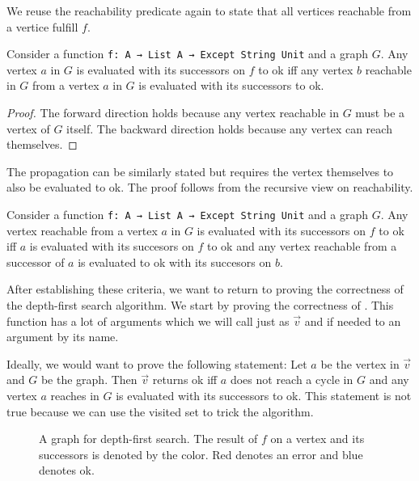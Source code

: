 We reuse the reachability predicate again to state that all vertices reachable from a vertice fulfill $f$.

\begin{lemma}[\allTrueIfAllCanReachTrue]\label{lem:allTrueIfAllCanReachTrue}
  Consider a function \lstinline|f: A → List A → Except String Unit| and a graph $G$. Any vertex $a$ in $G$ is evaluated with its successors on $f$ to ok iff any vertex $b$ reachable in $G$ from a vertex $a$ in $G$ is evaluated with its successors to ok.
\end{lemma}
\begin{proof}
  The forward direction holds because any vertex reachable in $G$ must be a vertex of $G$ itself. The backward direction holds because any vertex can reach themselves.
\end{proof}

The propagation can be similarly stated but requires the vertex themselves to also be evaluated to ok. The proof follows from the recursive view on reachability.

\begin{lemma}[\canReachLemma]
  Consider a function \lstinline|f: A → List A → Except String Unit| and a graph $G$.
  Any vertex reachable from a vertex $a$ in $G$ is evaluated with its successors on $f$ to ok iff $a$ is evaluated with its succesors on $f$ to ok and any vertex reachable from a successor of $a$ is evaluated to ok with its succesors on $b$.
\end{lemma}

After establishing these criteria, we want to return to proving the correctness of the depth-first search algorithm. We start by proving the correctness of \dfsstep. This function has a lot of arguments which we will call just as $\vec{v}$ and if needed to an argument by its name.

Ideally, we would want to prove the following statement: Let $a$ be the vertex in $\vec{v}$ and $G$ be the graph. Then \dfsstep $\vec{v}$ returns ok iff $a$ does not reach a cycle in $G$ and any vertex $a$ reaches in $G$ is evaluated with its successors to ok. This statement is not true because we can use the visited set to trick the algorithm.

\begin{figure}
  \centering
  \caption{A graph for depth-first search. The result of $f$ on a vertex and its successors is denoted by the color. Red denotes an error and blue denotes ok.}
  \label{fig:dfsSetProblem}
\end{figure}

